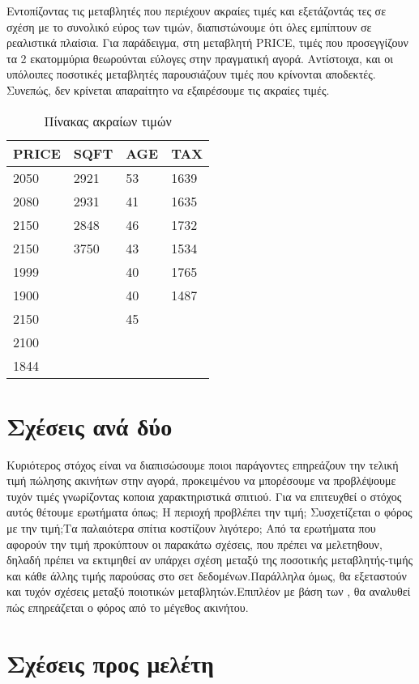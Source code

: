 \documentclass[
  10pt,
]{article}
\begin{document}
Εντοπίζοντας τις μεταβλητές που περιέχουν ακραίες τιμές και εξετάζοντάς
τες σε σχέση με το συνολικό εύρος των τιμών, διαπιστώνουμε ότι όλες
εμπίπτουν σε ρεαλιστικά πλαίσια. Για παράδειγμα, στη μεταβλητή PRICE,
τιμές που προσεγγίζουν τα 2 εκατομμύρια θεωρούνται εύλογες στην
πραγματική αγορά. Αντίστοιχα, και οι υπόλοιπες ποσοτικές μεταβλητές
παρουσιάζουν τιμές που κρίνονται αποδεκτές. Συνεπώς, δεν κρίνεται
απαραίτητο να εξαιρέσουμε τις ακραίες τιμές.

\begin{table}

\caption{\label{tab:outliers}Πίνακας ακραίων τιμών}
\centering
\begin{tabular}[t]{l|l|l|l}
\hline
PRICE & SQFT & AGE & TAX\\
\hline
2050 & 2921 & 53 & 1639\\
\hline
2080 & 2931 & 41 & 1635\\
\hline
2150 & 2848 & 46 & 1732\\
\hline
2150 & 3750 & 43 & 1534\\
\hline
1999 &  & 40 & 1765\\
\hline
1900 &  & 40 & 1487\\
\hline
2150 &  & 45 & \\
\hline
2100 &  &  & \\
\hline
1844 &  &  & \\
\hline
\end{tabular}
\end{table}

\section*{Σχέσεις ανά δύο}

Κυριότερος στόχος είναι να διαπισώσουμε ποιοι παράγοντες επηρεάζουν την
τελική τιμή πώλησης ακινήτων στην αγορά, προκειμένου να μπορέσουμε να
προβλέψουμε τυχόν τιμές γνωρίζοντας κοποια χαρακτηριστικά σπιτιού. Για
να επιτευχθεί ο στόχος αυτός θέτουμε ερωτήματα όπως; Η περιοχή προβλέπει
την τιμή; Συσχετίζεται ο φόρος με την τιμή;Τα παλαιότερα σπίτια
κοστίζουν λιγότερο; Από τα ερωτήματα που αφορούν την τιμή προκύπτουν οι
παρακάτω σχέσεις, που πρέπει να μελετηθουν, δηλαδή πρέπει να εκτιμηθεί
αν υπάρχει σχέση μεταξύ της ποσοτικής μεταβλητής-τιμής και κάθε άλλης
τιμής παρούσας στο σετ δεδομένων.Παράλληλα όμως, θα εξεταστούν και τυχόν
σχέσεις μεταξύ ποιοτικών μεταβλητών.Επιπλέον με βάση των , θα αναλυθεί
πώς επηρεάζεται ο φόρος από το μέγεθος ακινήτου.

\section*{{\large Σχέσεις προς μελέτη}}
\end{document}

